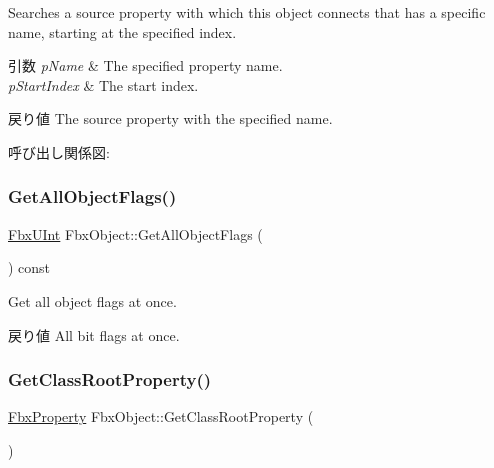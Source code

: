 Searches a source property with which this object connects that has a specific name, starting at the specified index. 
\begin{DoxyParams}{引数}
{\em p\+Name} & The specified property name. \\
\hline
{\em p\+Start\+Index} & The start index. \\
\hline
\end{DoxyParams}
\begin{DoxyReturn}{戻り値}
The source property with the specified name. 
\end{DoxyReturn}
呼び出し関係図\+:
\mbox{\label{class_fbx_object_a18b30c43de008570c05f3a6f1e46eb10}} 
\subsubsection{\texorpdfstring{Get\+All\+Object\+Flags()}{GetAllObjectFlags()}}
{\footnotesize\ttfamily \hyperlink{fbxtypes_8h_ae9fb141d8158a730aa85ec5ff2ea3f6b}{Fbx\+U\+Int} Fbx\+Object\+::\+Get\+All\+Object\+Flags (\begin{DoxyParamCaption}{ }\end{DoxyParamCaption}) const}

Get all object flags at once. \begin{DoxyReturn}{戻り値}
All bit flags at once. 
\end{DoxyReturn}
\mbox{\label{class_fbx_object_a70e190147f28712dee1ec1e00b73c24e}} 
\subsubsection{\texorpdfstring{Get\+Class\+Root\+Property()}{GetClassRootProperty()}}
{\footnotesize\ttfamily \hyperlink{class_fbx_property}{Fbx\+Property} Fbx\+Object\+::\+Get\+Class\+Root\+Property (\begin{DoxyParamCaption}{ }\end{DoxyParamCaption})}

